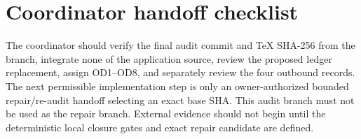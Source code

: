 \documentclass[11pt]{article}
\begin{document}
\section{Coordinator handoff checklist}

The coordinator should verify the final audit commit and TeX SHA-256 from the
branch, integrate none of the application source, review the proposed ledger
replacement, assign OD1--OD8, and separately review the four outbound records.
The next permissible implementation step is only an owner-authorized bounded
repair/re-audit handoff selecting an exact base SHA.  This audit branch must
not be used as the repair branch.  External evidence should not begin until
the deterministic local closure gates and exact repair candidate are defined.
\end{document}
